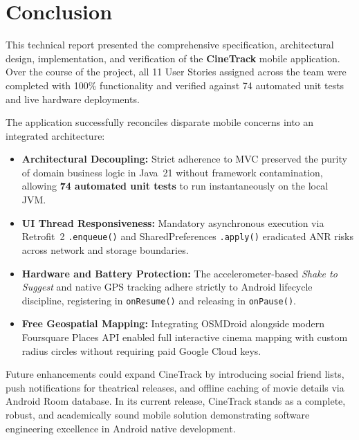 \documentclass[runningheads,a4paper]{llncs}
\begin{document}
\newpage

\section{Conclusion}
This technical report presented the comprehensive specification, architectural design, implementation, and verification of the \textbf{CineTrack} mobile application. Over the course of the project, all 11 User Stories assigned across the team were completed with 100\% functionality and verified against 74 automated unit tests and live hardware deployments.

The application successfully reconciles disparate mobile concerns into an integrated architecture:
\begin{itemize}
    \item \textbf{Architectural Decoupling:} Strict adherence to MVC preserved the purity of domain business logic in Java~21 without framework contamination, allowing \textbf{74 automated unit tests} to run instantaneously on the local JVM.
    \item \textbf{UI Thread Responsiveness:} Mandatory asynchronous execution via Retrofit~2 \texttt{.enqueue()} and SharedPreferences \texttt{.apply()} eradicated ANR risks across network and storage boundaries.
    \item \textbf{Hardware and Battery Protection:} The accelerometer-based \textit{Shake to Suggest} and native GPS tracking adhere strictly to Android lifecycle discipline, registering in \texttt{onResume()} and releasing in \texttt{onPause()}.
    \item \textbf{Free Geospatial Mapping:} Integrating OSMDroid alongside modern Foursquare Places API enabled full interactive cinema mapping with custom radius circles without requiring paid Google Cloud keys.
\end{itemize}

Future enhancements could expand CineTrack by introducing social friend lists, push notifications for theatrical releases, and offline caching of movie details via Android Room database. In its current release, CineTrack stands as a complete, robust, and academically sound mobile solution demonstrating software engineering excellence in Android native development.

\newpage

\renewcommand{\refname}{References}
\end{document}
